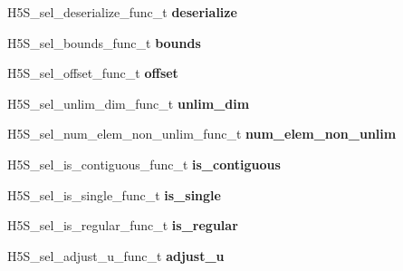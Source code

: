 \begin{DoxyCompactItemize}
\mbox{\label{struct_h5_s__select__class__t_a922d79b5e97c3d675eb65ded10e5a255}} 
H5\+S\+\_\+sel\+\_\+deserialize\+\_\+func\+\_\+t {\bfseries deserialize}
\item 
\mbox{\label{struct_h5_s__select__class__t_a91f510af4e5d13c8081bb82a6f446224}} 
H5\+S\+\_\+sel\+\_\+bounds\+\_\+func\+\_\+t {\bfseries bounds}
\item 
\mbox{\label{struct_h5_s__select__class__t_a2c4a3f7b76df46d4e652e91f781e3209}} 
H5\+S\+\_\+sel\+\_\+offset\+\_\+func\+\_\+t {\bfseries offset}
\item 
\mbox{\label{struct_h5_s__select__class__t_a3f81b068f663eaab1a943e38b1f6bfd4}} 
H5\+S\+\_\+sel\+\_\+unlim\+\_\+dim\+\_\+func\+\_\+t {\bfseries unlim\+\_\+dim}
\item 
\mbox{\label{struct_h5_s__select__class__t_abfb4ac07e2f6156f3dd54c314e32dc62}} 
H5\+S\+\_\+sel\+\_\+num\+\_\+elem\+\_\+non\+\_\+unlim\+\_\+func\+\_\+t {\bfseries num\+\_\+elem\+\_\+non\+\_\+unlim}
\item 
\mbox{\label{struct_h5_s__select__class__t_a1b75400f1f640d74fe3e76e92c6d6497}} 
H5\+S\+\_\+sel\+\_\+is\+\_\+contiguous\+\_\+func\+\_\+t {\bfseries is\+\_\+contiguous}
\item 
\mbox{\label{struct_h5_s__select__class__t_afb784f4e9e8a609b4657ea2e1c310631}} 
H5\+S\+\_\+sel\+\_\+is\+\_\+single\+\_\+func\+\_\+t {\bfseries is\+\_\+single}
\item 
\mbox{\label{struct_h5_s__select__class__t_ada1d956efaee8c7387d68395b99a22fd}} 
H5\+S\+\_\+sel\+\_\+is\+\_\+regular\+\_\+func\+\_\+t {\bfseries is\+\_\+regular}
\item 
\mbox{\label{struct_h5_s__select__class__t_a2859282a446fa801282ea974b5a9c9ff}} 
H5\+S\+\_\+sel\+\_\+adjust\+\_\+u\+\_\+func\+\_\+t {\bfseries adjust\+\_\+u}
\item 
\mbox{\label{struct_h5_s__select__class__t_a431e62a813eaaf0ca63e44c4e0931916}} 

\end{DoxyCompactItemize}
